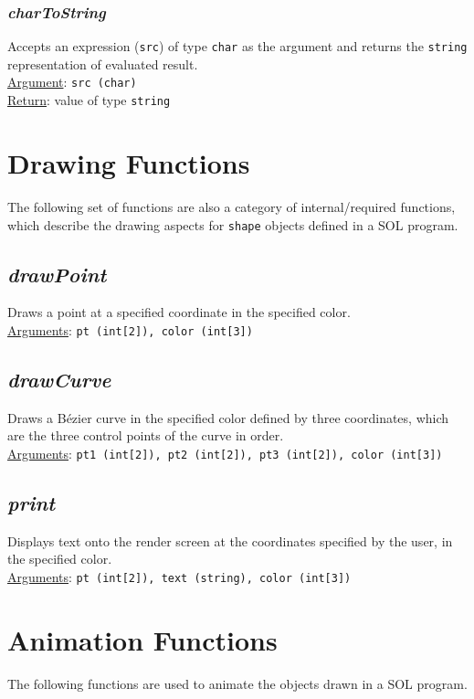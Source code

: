 \documentclass[letterpaper,12pt]{article}
\begin{document}
    \subsubsection{\textit{charToString}}
    Accepts an expression (\texttt{src}) of type \texttt{char} as the argument and returns the \texttt{string} representation of evaluated result.\\
    \underline{Argument}: \texttt{src (char)}\\
    \underline{Return}: value of type \texttt{string}

\section{Drawing Functions}
The following set of functions are also a category of internal/required functions, which describe the drawing aspects for \texttt{shape} objects defined in a SOL program.

    \subsection{\textit{drawPoint}}
    Draws a point at a specified coordinate in the specified color.\\
    \underline{Arguments}: \texttt{pt (int[2]), color (int[3])}

    \subsection{\textit{drawCurve}}
    Draws a B\'ezier curve in the specified color defined by three coordinates, which are the three control points of the curve in order.\\
    \underline{Arguments}: \texttt{pt1 (int[2]), pt2 (int[2]), pt3 (int[2]), color (int[3])}

    \subsection{\textit{print}}
    Displays text onto the render screen at the coordinates specified by the user, in the specified color.\\
    \underline{Arguments}: \texttt{pt (int[2]), text (string), color (int[3])}

\section{Animation Functions} \label{animation}
The following functions are used to animate the objects drawn in a SOL program.
\end{document}
